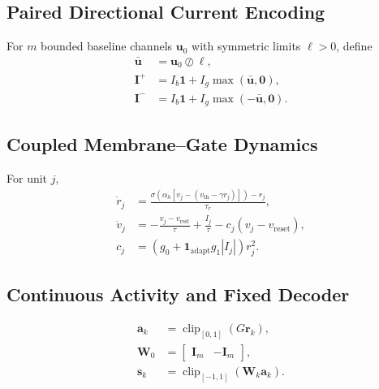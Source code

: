 \documentclass[letterpaper,10pt,conference]{ieeeconf}
\newcommand{\clip}{\operatorname{clip}}
\begin{document}
\subsection{Paired Directional Current Encoding}

For $m$ bounded baseline channels $\bm u_0$ with symmetric limits
$\bm\ell>0$, define
\begin{align}
    \bar{\bm u} &= \bm u_0\oslash\bm\ell, \\
    \bm I^+ &= I_b\bm 1+I_g\max(\bar{\bm u},\bm 0), \\
    \bm I^- &= I_b\bm 1+I_g\max(-\bar{\bm u},\bm 0).
\end{align}


\subsection{Coupled Membrane--Gate Dynamics}

For unit $j$,
\begin{align}
    \dot r_j &= \frac{\sigma\!\left(
        \alpha_h[v_j-(v_{\mathrm{th}}-\gamma r_j)]\right)-r_j}
        {\tau_r}, \\
    \dot v_j &= -\frac{v_j-v_{\mathrm{rest}}}{\tau}
        +\frac{I_j}{\tau}
        -c_j(v_j-v_{\mathrm{reset}}), \\
    c_j &= \left(g_0+\mathbf{1}_{\mathrm{adapt}}g_1|I_j|\right)r_j^2.
\end{align}


\subsection{Continuous Activity and Fixed Decoder}

\begin{align}
    \bm a_k &= \clip_{[0,1]}(G\bm r_k), \\
    \bm W_0 &= \begin{bmatrix}\bm I_m&-\bm I_m\end{bmatrix}, \\
    \bm s_k &= \clip_{[-1,1]}(\bm W_k\bm a_k).
\end{align}
\end{document}
